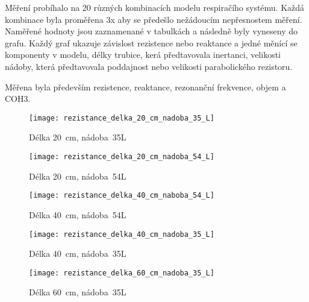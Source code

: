 Měření probíhalo na 20 různých kombinacích modelu respiračího systému. Každá kombinace byla proměřena 3x aby se předešlo nežádoucím nepřesnostem měření. Naměřené hodnoty jsou zaznamenané v tabulkách a následně byly vyneseny do grafu. Každý graf ukazuje závislost rezistence nebo reaktance a jedné měnící se komponenty v modelu, délky trubice, kerá předtavovala inertanci, velikosti nádoby, která předtavovala poddajnost nebo velikosti parabolického rezistoru.

Měřena byla především rezistence, reaktance, rezonanční frekvence, objem a COH3. 

\begin{figure}[ht]
	\label{img:pic_rezistance_delka_20_cm_nadoba_35_L}
	\begin{center}
		\texttt{[image: rezistance\_delka\_20\_cm\_nadoba\_35\_L]}
		\caption{Délka 20~cm, nádoba~35L}
	\end{center}
\end{figure}

\begin{figure}[ht]
	\label{img:pic_rezistance_delka_20_cm_nadoba_54_L}
	\begin{center}
		\texttt{[image: rezistance\_delka\_20\_cm\_nadoba\_54\_L]}
		\caption{Délka 20~cm, nádoba~54L}
	\end{center}
\end{figure}

\begin{figure}[ht]
	\label{img:pic_rezistance_delka_40_cm_naboba_54_L}
	\begin{center}
		\texttt{[image: rezistance\_delka\_40\_cm\_naboba\_54\_L]}
		\caption{Délka 40~cm, nádoba~54L}
	\end{center}
\end{figure}

\begin{figure}[ht]
	\label{img:pic_rezistance_delka_40_cm_nadoba_35_L}
	\begin{center}
		\texttt{[image: rezistance\_delka\_40\_cm\_nadoba\_35\_L]}
		\caption{Délka 40~cm, nádoba~35L}
	\end{center}
\end{figure}

\begin{figure}[ht]
	\label{img:pic_rezistance_delka_60_cm_nadoba_35_L}
	\begin{center}
		\texttt{[image: rezistance\_delka\_60\_cm\_nadoba\_35\_L]}
		\caption{Délka 60~cm, nádoba~35L}
	\end{center}
\end{figure}

